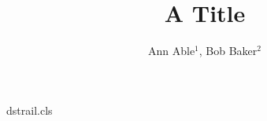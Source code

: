 \begin{filecontents*}[overwrite]{dstrail.cls}
\def\affiliation#1{\gdef\@affil{\it #1}}
\def\@maketitle{\begin{center}{\LARGE\@title\par}\vskip1em{\large\@author\par}\end{center}
  {\small\@affil\par}\vskip1em}
\end{filecontents*}
\documentclass{dstrail}

\title{A Title}
\author{Ann Able$^{1}$, Bob Baker$^{2}$}
\maketitle
Text.


